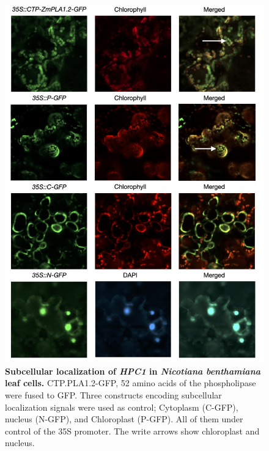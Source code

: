 \documentclass[9pt,twocolumn,twoside,lineno]{BioRxiv}
\begin{document}
\begin{figure}[t]
\begin{center}
\includegraphics[width=0.6\paperwidth]{Sup_Figures/Sup_Fig_7.png}
\caption{\textbf{Subcellular localization of \textit{HPC1} in \textit{Nicotiana benthamiana} leaf cells.}   
CTP.PLA1.2-GFP, 52 amino acids of the phospholipase were fused to GFP. 
Three constructs encoding subcellular localization signals were used as control; Cytoplasm (C-GFP), nucleus (N-GFP), and Chloroplast (P-GFP). All of them under control of the 35S promoter. The write arrows show chloroplast and nucleus.
}
\label{SupFig6}
\end{center}
\end{figure} 

\clearpage
\end{document}
